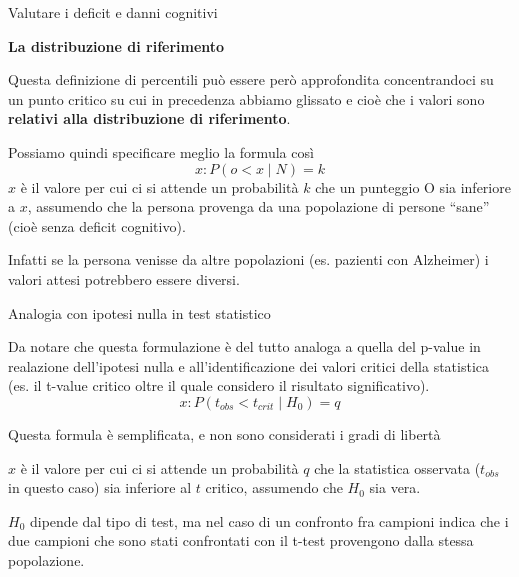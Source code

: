 \documentclass[
  ignorenonframetext,
]{beamer}
\begin{document}
\begin{frame}{Valutare i deficit e danni cognitivi}
\label{valutare-i-deficit-e-danni-cognitivi-1}
\begin{center}
  \textbf{La distribuzione di riferimento}
\end{center}
\vspace{1em}

Questa definizione di percentili può essere però approfondita
concentrandoci su un punto critico su cui in precedenza abbiamo glissato
e cioè che i valori sono \textbf{relativi alla distribuzione di
riferimento}.

Possiamo quindi specificare meglio la formula così \[
x : P(o< x∣N )=k
\] \(x\) è il valore per cui ci si attende un probabilità \(k\) che un
punteggio O sia inferiore a \(x\), assumendo che la persona provenga da
una popolazione di persone ``sane'' (cioè senza deficit cognitivo).

Infatti se la persona venisse da altre popolazioni (es. pazienti con
Alzheimer) i valori attesi potrebbero essere diversi.
\end{frame}

\begin{frame}{Analogia con ipotesi nulla in test statistico}
\label{analogia-con-ipotesi-nulla-in-test-statistico}
\small

Da notare che questa formulazione è del tutto analoga a quella del
p-value in realazione dell'ipotesi nulla e all'identificazione dei
valori critici della statistica (es. il t-value critico oltre il quale
considero il risultato significativo). \[
x : P (t_{obs}<t_{crit}∣H_0)=q
\]

\begin{center}
\begin{footnotesize}
Questa formula è semplificata, e non sono considerati i gradi di libertà
\end{footnotesize}
\end{center}

\(x\) è il valore per cui ci si attende un probabilità \(q\) che la
statistica osservata (\(t_{obs}\) in questo caso) sia inferiore al \(t\)
critico, assumendo che \(H_0\) sia vera.

\(H_0\) dipende dal tipo di test, ma nel caso di un confronto fra
campioni indica che i due campioni che sono stati confrontati con il
t-test provengono dalla stessa popolazione.
\end{frame}
\end{document}
